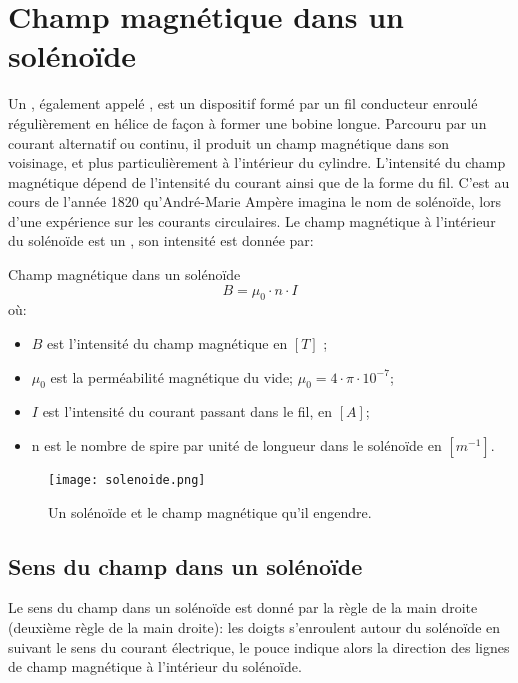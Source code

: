 \section{Champ magnétique dans un solénoïde}
Un , également appelé , est un dispositif formé par un fil conducteur enroulé  régulièrement en hélice de façon à former une bobine longue. Parcouru par un courant alternatif ou continu, il produit un champ magnétique dans son voisinage, et plus particulièrement à l'intérieur du cylindre. L'intensité du champ magnétique dépend de l'intensité du courant ainsi que de la forme du fil. C'est au cours de l'année 1820 qu'André-Marie Ampère imagina le nom de solénoïde, lors d'une expérience sur les courants circulaires.
Le champ magnétique à l'intérieur du solénoïde est un , son intensité est donnée par:
\begin{encadre_equation*}{Champ magnétique dans un solénoïde}
    \begin{equation}
        B =\mu_0 \cdot n \cdot I
    \end{equation}
    où:
    \begin{itemize}[label=\textbullet]
        \item \(B\) est l'intensité du champ magnétique en \([T]\) ;
        \item \(\mu_0\) est la perméabilité magnétique du vide; \(\mu_0=4 \cdot \pi \cdot 10^{-7}\);
        \item \(I\) est l'intensité du courant passant dans le fil, en \([A]\);
        \item n est le nombre de spire par unité de longueur dans le solénoïde en \([m^{-1}]\).
    \end{itemize}
\end{encadre_equation*}

\begin{figure}[ht]
    \centering
    \texttt{[image: solenoide.png]}
    \caption{Un solénoïde et le champ magnétique qu'il engendre.}
    \label{solenoide}
\end{figure}

\newpage

\subsection{Sens du champ dans un solénoïde}
Le sens du champ dans un solénoïde est donné par la règle de la main droite (deuxième règle de la main droite): les doigts s'enroulent autour du solénoïde en suivant le sens du courant électrique, le pouce indique alors la direction des lignes de champ magnétique à l'intérieur du solénoïde.

